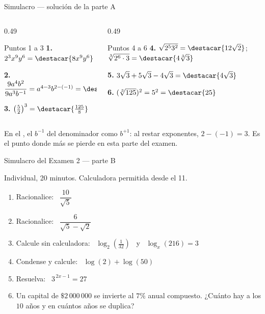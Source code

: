 \documentclass[aspectratio=169,10pt]{beamer}
\begin{document}
\begin{frame}{Simulacro — solución de la parte A}
  \scriptsize
  \begin{columns}[T,onlytextwidth]
    \begin{column}{0.49\textwidth}
      \begin{block}{Puntos 1 a 3}
        \tiny
        \textbf{1.} $2^{3}x^{9}y^{6} = \destacar{8x^{9}y^{6}}$

        \vspace{0.08cm}
        \textbf{2.} $\dfrac{9a^{4}b^{2}}{9a^{3}b^{-1}}
        = a^{4-3}b^{2-(-1)} = \destacar{ab^{3}}$

        \vspace{0.08cm}
        \textbf{3.} $\left(\tfrac{5}{2}\right)^{3}
        = \destacar{\tfrac{125}{8}}$
      \end{block}
    \end{column}
    \begin{column}{0.49\textwidth}
      \begin{block}{Puntos 4 a 6}
        \tiny
        \textbf{4.} $\sqrt{2^{5}3^{2}} = \destacar{12\sqrt{2}}$; \
        $\sqrt[3]{2^{6}\cdot 3} = \destacar{4\sqrt[3]{3}}$

        \vspace{0.08cm}
        \textbf{5.} $3\sqrt3+5\sqrt3-4\sqrt3 = \destacar{4\sqrt{3}}$

        \vspace{0.08cm}
        \textbf{6.} $(\sqrt[3]{125})^{2} = 5^{2} = \destacar{25}$
      \end{block}
    \end{column}
  \end{columns}

  \vspace{0.08cm}
  {\tiny\color{uniGris} En el , el $b^{-1}$ del denominador
  \azul{sube} como $b^{+1}$: al restar exponentes, $2-(-1)=3$. Es el punto
  donde más se pierde en esta parte del examen.}
\end{frame}

\begin{frame}{Simulacro del Examen 2 — parte B}
  \begin{alertblock}{Individual, 20 minutos. Calculadora permitida desde el 11.}
    \scriptsize
    \begin{enumerate}\setlength{\itemsep}{0.0cm}
      \setcounter{enumi}{6}
      \item Racionalice: \ $\dfrac{10}{\sqrt{5}}$
      \item Racionalice: \ $\dfrac{6}{\sqrt{5}-\sqrt{2}}$
      \item Calcule sin calculadora: \ $\log_{2}\!\left(\tfrac{1}{32}\right)$
            \ y \ $\log_{x}(216)=3$
      \item Condense y calcule: \ $\log(2)+\log(50)$
      \item Resuelva: \ $3^{\,2x-1} = 27$
      \item Un capital de $\$2\,000\,000$ se invierte al $7\%$ anual
            compuesto. ¿Cuánto hay a los $10$ años y en cuántos años se
            duplica?
    \end{enumerate}
  \end{alertblock}
\end{frame}
\end{document}

